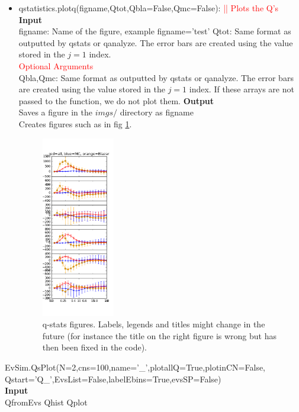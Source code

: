 \documentclass[article, superscriptaddress, ctexart, nofootinbib]{revtex4}
\newcommand{\tcr}{\textcolor{red}}
\begin{document}
\begin{itemize}

 \item{qstatistics.plotq(figname,Qtot,Qbla=False,Qmc=False): \tcr{|| Plots the Q's }}\\
 {\bf{Input}}\\ 
 figname: Name of the figure, example figname='test'
 Qtot: Same format as outputted by qstats or qanalyze. The error bars are created using the value stored in the $j=1$ index.\\
 \tcr{Optional Arguments}\\
 Qbla,Qmc: Same format as outputted by qstats or qanalyze. The error bars are created using the value stored in the $j=1$ index. If these arrays are not passed to the function, we do not plot them.
     \newline
 {\bf{Output}}\\
 Saves a figure in the $imgs/$ directory as figname\\
  Creates figures such as in fig \ref{qplotex}.

   \begin{figure}[tbhp]
	\centering
	\includegraphics[width=0.3\textwidth]{qplotex1.png}
	\caption{q-stats figures. Labels, legends and titles might change in the future (for instance the title on the right figure is wrong but has then
	been fixed in the code).}\label{qplotex}
    \end{figure}
 \end{itemize}
 
 
\item{EvSim.QsPlot(N=2,cns=100,name='_',plotallQ=True,plotinCN=False,
    Qstart='Q_',EvsList=False,labelEbins=True,evsSP=False)}\\
    {\bf{Input}}\\
 QfromEvs
 Qhist
 Qplot
\end{document}
